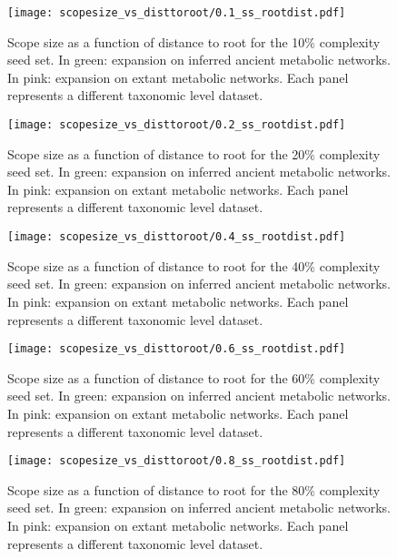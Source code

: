\begin{figure}[H]
    \centering
    \texttt{[image: scopesize\_vs\_disttoroot/0.1\_ss\_rootdist.pdf]}
    \caption{Scope size as a function of distance to root for the 10\% complexity seed set. In green: expansion on inferred ancient metabolic networks. In pink: expansion on extant metabolic networks. Each panel represents a different taxonomic level dataset.}
    \label{0.1_scopesize}
\end{figure}   

\begin{figure}[H]
    \centering
    \texttt{[image: scopesize\_vs\_disttoroot/0.2\_ss\_rootdist.pdf]}
    \caption{Scope size as a function of distance to root for the 20\% complexity seed set. In green: expansion on inferred ancient metabolic networks. In pink: expansion on extant metabolic networks. Each panel represents a different taxonomic level dataset.}
    \label{0.2_scopesize}
\end{figure}   

\begin{figure}[H]
    \centering
    \texttt{[image: scopesize\_vs\_disttoroot/0.4\_ss\_rootdist.pdf]}
    \caption{Scope size as a function of distance to root for the 40\% complexity seed set. In green: expansion on inferred ancient metabolic networks. In pink: expansion on extant metabolic networks. Each panel represents a different taxonomic level dataset.}
    \label{0.4_scopesize}
\end{figure}   

\begin{figure}[H]
    \centering
    \texttt{[image: scopesize\_vs\_disttoroot/0.6\_ss\_rootdist.pdf]}
    \caption{Scope size as a function of distance to root for the 60\% complexity seed set. In green: expansion on inferred ancient metabolic networks. In pink: expansion on extant metabolic networks. Each panel represents a different taxonomic level dataset.}
    \label{0.6_scopesize}
\end{figure}   

\begin{figure}[H]
    \centering
    \texttt{[image: scopesize\_vs\_disttoroot/0.8\_ss\_rootdist.pdf]}
    \caption{Scope size as a function of distance to root for the 80\% complexity seed set. In green: expansion on inferred ancient metabolic networks. In pink: expansion on extant metabolic networks. Each panel represents a different taxonomic level dataset.}
    \label{0.8_scopesize}
\end{figure}   

